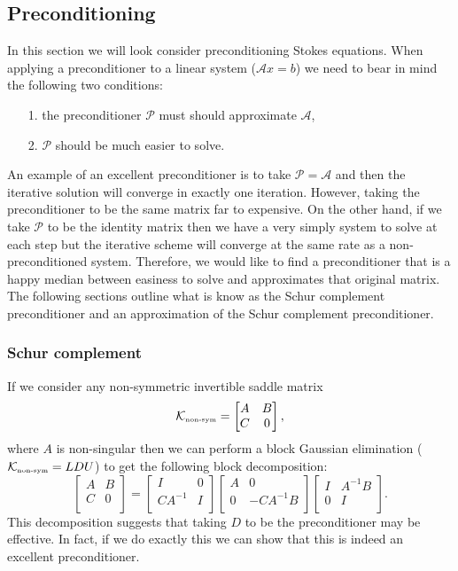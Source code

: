 \documentclass[11pt]{article}
\numberwithin{equation}{section}    %
\begin{document}
\subsection{Preconditioning} \label{sec:precond}

In this section we will look consider preconditioning Stokes equations. When  applying a preconditioner to a linear system ($\mathcal{A} x = b$) we need to bear in mind the following two conditions:
\begin{itemize}
    \item[1.] the preconditioner $\mathcal{P}$ must should approximate $\mathcal{A}$,
    \item[2.] $\mathcal{P}$ should be much easier to solve.
\end{itemize}
An example of an excellent preconditioner is to take $\mathcal{P} = \mathcal{A}$ and then the iterative solution will converge in exactly one iteration. However, taking the preconditioner to be the same matrix far to expensive. On the other hand, if we take $\mathcal{P}$ to be the identity matrix then we have a very simply system to solve at each step but the iterative scheme will converge at the same rate as a non-preconditioned system. Therefore, we would like to find a preconditioner that is a happy median between easiness to solve and approximates that original matrix. The following sections outline what is know as the Schur complement preconditioner and an approximation of the Schur complement preconditioner.

\subsubsection{Schur complement } \label{sec:schur}

If we consider any non-symmetric invertible saddle matrix
$$\mathcal{K}_{\mbox{\tiny{non-sym}}} = \begin{bmatrix}
A & B\\
C & 0\\
\end{bmatrix}, $$
where $A$ is non-singular then we can perform a block Gaussian elimination ($\mathcal{K}_{\mbox{\tiny{non-sym}}}  = LDU$) to get the following block decomposition:
$$\begin{bmatrix}
A & B\\
C & 0\\
\end{bmatrix}=
\begin{bmatrix}
I& 0\\
CA^{-1}& I\\
\end{bmatrix}
\begin{bmatrix}
A& 0\\
0& -CA^{-1}B\\
\end{bmatrix}
\begin{bmatrix}
I & A^{-1}B\\
0& I\\
\end{bmatrix}.$$
This decomposition suggests that taking $D$ to be the preconditioner may be effective. In fact, if we do exactly this we can show that this is indeed an excellent preconditioner.
\end{document}
